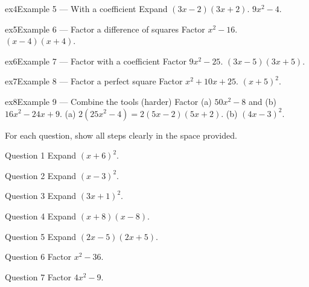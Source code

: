 \documentclass[11pt]{article}
\begin{document}
\begin{example}{ex4}{Example 5 --- With a coefficient}
Expand $(3x-2)(3x+2)$.
\soln $9x^2-4.$
\end{example}

\begin{example}{ex5}{Example 6 --- Factor a difference of squares}
Factor $x^2-16$.
\soln $(x-4)(x+4).$
\end{example}

\begin{example}{ex6}{Example 7 --- Factor with a coefficient}
Factor $9x^2-25$.
\soln $(3x-5)(3x+5).$
\end{example}

\begin{example}{ex7}{Example 8 --- Factor a perfect square}
Factor $x^2+10x+25$.
\soln $(x+5)^2.$
\end{example}

\begin{example}{ex8}{Example 9 --- Combine the tools (harder)}
Factor (a) $50x^2-8$ and (b) $16x^2-24x+9$.
\soln (a) $2(25x^2-4)=2(5x-2)(5x+2)$. (b) $(4x-3)^2.$
\end{example}

\clearpage
{}
For each question, show all steps clearly in the space provided.

\begin{qbox}{Question 1}
Expand $(x+6)^2$.\workspace{1.8cm}
\end{qbox}

\begin{qbox}{Question 2}
Expand $(x-3)^2$.\workspace{1.8cm}
\end{qbox}

\begin{qbox}{Question 3}
Expand $(3x+1)^2$.\workspace{1.8cm}
\end{qbox}

\begin{qbox}{Question 4}
Expand $(x+8)(x-8)$.\workspace{1.8cm}
\end{qbox}

\begin{qbox}{Question 5}
Expand $(2x-5)(2x+5)$.\workspace{1.8cm}
\end{qbox}

\begin{qbox}{Question 6}
Factor $x^2-36$.\workspace{1.8cm}
\end{qbox}

\begin{qbox}{Question 7}
Factor $4x^2-9$.\workspace{1.8cm}
\end{qbox}
\end{document}
